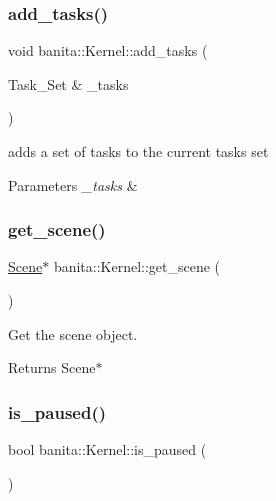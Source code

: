 \subsubsection{\texorpdfstring{add\_tasks()}{add\_tasks()}\hspace{0.1cm}{\footnotesize\ttfamily [2/2]}}
{\footnotesize\ttfamily void banita\+::\+Kernel\+::add\+\_\+tasks (\begin{DoxyParamCaption}\item[{Task\+\_\+\+Set \&}]{\+\_\+tasks }\end{DoxyParamCaption})}



adds a set of tasks to the current tasks set 


\begin{DoxyParams}{Parameters}
{\em \+\_\+tasks} & \\
\hline
\end{DoxyParams}
\mbox{\label{classbanita_1_1_kernel_a0a5e53e8727da203aad7dcb730a39244}} 
\subsubsection{\texorpdfstring{get\_scene()}{get\_scene()}}
{\footnotesize\ttfamily \mbox{\hyperlink{classbanita_1_1_scene}{Scene}}$\ast$ banita\+::\+Kernel\+::get\+\_\+scene (\begin{DoxyParamCaption}{ }\end{DoxyParamCaption})\hspace{0.3cm}{\ttfamily [inline]}}



Get the scene object. 

\begin{DoxyReturn}{Returns}
Scene$\ast$ 
\end{DoxyReturn}
\mbox{\label{classbanita_1_1_kernel_a7d940a9448b56f01eb2ca1bc415b661f}} 
\subsubsection{\texorpdfstring{is\_paused()}{is\_paused()}}
{\footnotesize\ttfamily bool banita\+::\+Kernel\+::is\+\_\+paused (\begin{DoxyParamCaption}{ }\end{DoxyParamCaption})\hspace{0.3cm}{\ttfamily [inline]}}



